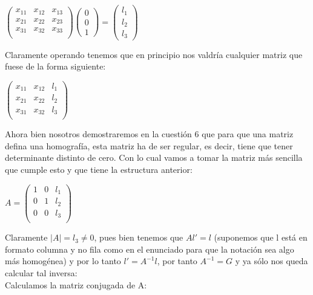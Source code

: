 \documentclass[10pt,a4paper]{article}
\begin{document}
\begin{center}
$\begin{pmatrix}
x_{11}&x_{12}&x_{13}\\
x_{21}&x_{22}&x_{23}\\
x_{31}&x_{32}&x_{33}\\
\end{pmatrix}
\begin{pmatrix}
0\\0\\1
\end{pmatrix}
=
\begin{pmatrix}
l_1\\l_2\\l_3
\end{pmatrix}
$
\end{center}

Claramente operando tenemos que en principio nos valdría cualquier matriz que fuese de la forma siguiente:

\begin{center}
$\begin{pmatrix}
x_{11}&x_{12}&l_1\\
x_{21}&x_{22}&l_2\\
x_{31}&x_{32}&l_3\\
\end{pmatrix}$
\end{center}

Ahora bien nosotros demostraremos en la cuestión 6 que para que una matriz defina una homografía, esta matriz ha de ser regular, es decir, tiene que tener determinante distinto de cero. Con lo cual vamos a tomar la matriz más sencilla que cumple esto y que tiene la estructura anterior:\\

\begin{center}
$A=\begin{pmatrix}
1&0&l_1\\
0&1&l_2\\
0&0&l_3\\
\end{pmatrix}$
\end{center}

Claramente $|A|=l_3\neq0$, pues bien tenemos que $Al'=l$ (suponemos que l está en formato columna y no fila como en el enunciado para que la notación sea algo más homogénea) y por lo tanto $l'=A^{-1}l$, por tanto $A^{-1} = G$ y ya sólo nos queda calcular tal inversa:\\

Calculamos la matriz conjugada de A:\\
\end{document}
